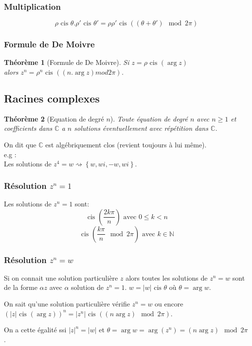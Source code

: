 \documentclass[a4paper,10pt]{report}
\newcommand{\cis}{\mbox{ cis }}
\newtheorem{theo}{Théorème}
\begin{document}
\subsubsection{Multiplication}
$$\rho \cis \theta . \rho' \cis \theta' = \rho\rho' \cis ((\theta + \theta')\mod 2\pi)$$

\subsubsection{Formule de De Moivre}
\begin{theo}[Formule de De Moivre]
Si $z=\rho \cis (\arg z)$\\
alors $z^n=\rho^n \cis ((n.\arg z) mod 2\pi)$.
\end{theo}

\subsection{Racines complexes}
\begin{theo}[Equation de degré $n$]
Toute équation de degré $n$ avec $n \geq 1$ et coefficients dans $\mathbb{C}$ a $n$ solutions éventuellement avec répétition dans $\mathbb{C}$.
\end{theo}
On dit que $\mathbb{C}$ est algébriquement clos (revient toujours à lui même).
\\e.g :
\\Les solutions de $z^4=w \rightsquigarrow \left\lbrace w,wi,-w,wi \right\rbrace$.
\subsubsection{Résolution $z^n = 1$}
Les solutions de $z^n = 1$ sont:
$$\cis \left(\frac{2k\pi}{n}\right) \mbox{ avec } 0 \leq k < n$$
$$\cis \left(\frac{k\pi}{n}\mod 2\pi\right) \mbox{ avec } k \in \mathbb{N}$$
\subsubsection{Résolution $z^n = w$}
Si on connait une solution particulière $z$ alors toutes les solutions de $z^n=w$ sont de la forme $\alpha z$ avec $\alpha$ solution de $z^n=1$.
$w=\vert w \vert \cis \theta$ où $\theta = \arg w$.

On sait qu'une solution particulière vérifie $z^n=w$ ou encore\\
$(\vert z \vert \cis (\arg z))^n = \vert z^n \vert \cis ((n \arg z) \mod 2\pi)$.

On a cette égalité ssi ${\vert z \vert}^n = \vert w \vert$ et $\theta = \arg w = \arg (z^n) = (n \arg z) \mod 2\pi$.
\end{document}
